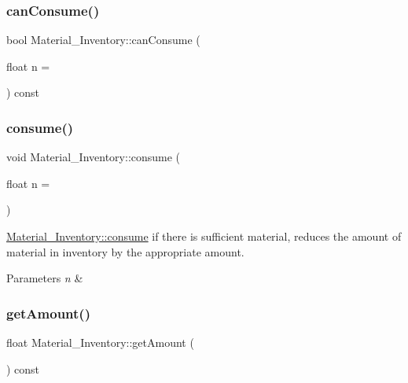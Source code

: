 \subsubsection{\texorpdfstring{canConsume()}{canConsume()}}
{\footnotesize\ttfamily bool Material\+\_\+\+Inventory\+::can\+Consume (\begin{DoxyParamCaption}\item[{float}]{n = {} }\end{DoxyParamCaption}) const}

\mbox{\label{classMaterial__Inventory_a04344339b61a6978d0d669a13b7e034d}} 
\subsubsection{\texorpdfstring{consume()}{consume()}}
{\footnotesize\ttfamily void Material\+\_\+\+Inventory\+::consume (\begin{DoxyParamCaption}\item[{float}]{n = {} }\end{DoxyParamCaption})}



\mbox{\hyperlink{classMaterial__Inventory_a04344339b61a6978d0d669a13b7e034d}{Material\+\_\+\+Inventory\+::consume}} if there is sufficient material, reduces the amount of material in inventory by the appropriate amount. 


\begin{DoxyParams}{Parameters}
{\em n} & \\
\hline
\end{DoxyParams}
\mbox{\label{classMaterial__Inventory_acc6a2d2b8dc613689561b0165d591fb1}} 
\subsubsection{\texorpdfstring{getAmount()}{getAmount()}}
{\footnotesize\ttfamily float Material\+\_\+\+Inventory\+::get\+Amount (\begin{DoxyParamCaption}{ }\end{DoxyParamCaption}) const}



